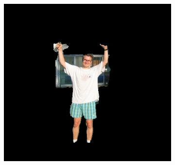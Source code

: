 \documentclass[a4paper,11]{article}
\begin{document}
\begin{center}
\begin{figure}[H]
\begin{subfigure}{0.33\textwidth}
      \centering
      \includegraphics[width=0.9\linewidth]{results/tennis}
   \end{subfigure}\\
    \vspace{1em}
    

\end{figure}
\end{center}
\end{document}
